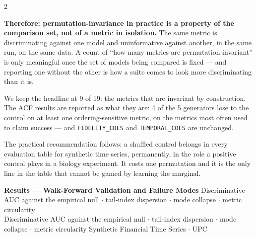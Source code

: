 \documentclass[10pt]{article}
\newcommand{\pagehead}[2]{%
  \begin{tcolorbox}[enhanced,arc=0pt,outer arc=0pt,boxrule=0pt,
    colback=Navy,colframe=Navy,
    top=5pt,bottom=5pt,left=8pt,right=8pt,
    before skip=0pt,after skip=10pt]
  {\color{white}\large\bfseries #1}%
  \ifx\relax#2\relax\else\\[1pt]{\color{blue!30!white}\small #2}\fi
  \hfill{\color{blue!20!white}\footnotesize Synthetic Financial Time Series $\cdot$ UPC}
  \end{tcolorbox}}
\begin{document}
\begin{multicols}{2}
{\smallskip
\textbf{Therefore: permutation-invariance in practice is a property of the comparison set, not of a metric in isolation.} The same metric is discriminating against one model and uninformative against another, in the same run, on the same data. A count of ``how many metrics are permutation-invariant'' is only meaningful once the set of models being compared is fixed --- and reporting one without the other is how a suite comes to look more discriminating than it is.

\smallskip
We keep the headline at 9 of 19: the metrics that are invariant by construction. The ACF results are reported as what they are: 4 of the 5 generators lose to the control on at least one ordering-sensitive metric, on the metrics most often used to claim success --- and \texttt{FIDELITY\_COLS} and \texttt{TEMPORAL\_COLS} are unchanged.

\smallskip
The practical recommendation follows: a shuffled control belongs in every evaluation table for synthetic time series, permanently, in the role a positive control plays in a biology experiment. It costs one permutation and it is the only line in the table that cannot be gamed by learning the marginal.}

\end{multicols}

\clearpage

\pagehead{Results --- Walk-Forward Validation and Failure Modes}
         {Discriminative AUC against the empirical null $\cdot$ tail-index dispersion $\cdot$ mode collapse $\cdot$ metric circularity}
\end{document}
